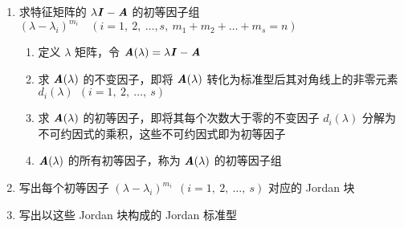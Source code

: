             \begin{enumerate}
                \item 求特征矩阵的 $\lambda \textbf{\textit{I}} - \textbf{\textit{A}}$ 的初等因子组 $(\lambda - \lambda_i)^{m_i} \quad (i = 1, \ 2, \ \dots, s, \ m_1 + m_2 + \dots + m_s = n)$
                \begin{enumerate}
                    \item 定义 $\lambda$ 矩阵，令 $\textbf{\textit{A}}(\lambda) = \lambda \textbf{\textit{I}} - \textbf{\textit{A}}$
                    \item 求 $\textbf{\textit{A}}(\lambda)$ 的不变因子，即将 $\textbf{\textit{A}}(\lambda)$ 转化为标准型后其对角线上的非零元素 $d_i(\lambda) \ \ (i = 1, \ 2, \ \dots, \ s)$
                    \item 求 $\textbf{\textit{A}}(\lambda)$ 的初等因子，即将其每个次数大于零的不变因子 $d_i(\lambda)$ 分解为不可约因式的乘积，这些不可约因式即为初等因子
                    \item $\textbf{\textit{A}}(\lambda)$ 的所有初等因子，称为 $\textbf{\textit{A}}(\lambda)$ 的初等因子组
                \end{enumerate}
                \item 写出每个初等因子 $(\lambda - \lambda_i)^{m_i} \ \ (i = 1, \ 2, \ \dots, \ s)$ 对应的 Jordan 块 
                \item 写出以这些 Jordan 块构成的 Jordan 标准型
            \end{enumerate}
            
